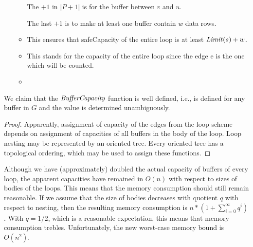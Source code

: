 \begin{itemize}
\begin{itemize}
        \textnormal{The $+1$ in $|P + 1|$ is for the buffer between $v$ and $u$. }
        
        \textnormal{The last $+1$ is to make at least one buffer contain $w$ data rows.}

      \item {}
        
        \textnormal {This ensures that safeCapacity of the entire loop is at least $\mf{limit}(s) + w$.}
      \item {}
        
        \textnormal{ This stands for the capacity of the entire loop since the edge e is the one which will be counted.}
      \item {}
    \end{itemize}
  \end{itemize}
\myenddef

We claim that the $\mf{bufferCapacity}$ function is well defined, i.e., is defined for any buffer in $G$ and the value is determined unambiguously.
  \begin{proof}
    Apparently, assignment of capacity of the edges from the loop scheme depends on assignment of capacities of all buffers in the body of the loop. Loop nesting may be represented by an oriented tree. Every oriented tree has a topological ordering, which may be used to assign these functions.
  \end{proof}
\myendclaim

  Although we have (approximately) doubled the actual capacity of buffers of every loop, the apparent capacities have remained in $O(n)$ with respect to sizes of bodies of the loops. This means that the memory consumption should still remain reasonable. If we assume that the size of bodies decreases with quotient $q$ with respect to nesting, then the resulting memory consumption is $n*(1+\sum_{i=0}^{\infty}q^i)$. With $q=1/2$, which is a reasonable expectation, this means that memory consumption trebles. Unfortunately, the new worst-case memory bound is $O(n^2)$.

